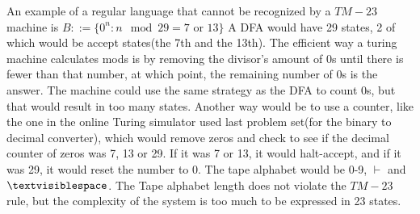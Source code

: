 \documentclass{article}
\begin{document}
\begin{center}
\end{center}

An example of a regular language that cannot be recognized by a $TM-23$ machine is $B ::= \{0^n:n \mod 29 = 7 \text{ or } 13\}$ A DFA would have 29 states, 2 of which would be accept states(the 7th and the 13th). The efficient way a turing machine calculates mods is by removing the divisor's amount of 0s until there is fewer than that number, at which point, the remaining number of 0s is the answer. The machine could use the same strategy as the DFA to count 0s, but that would result in too many states. Another way would be to use a counter, like the one in the online Turing simulator used last problem set(for the binary to decimal converter), which would remove zeros and check to see if the decimal counter of zeros was 7, 13 or 29. If it was 7 or 13, it would halt-accept, and if it was 29, it would reset the number to 0. The tape alphabet would be 0-9, $\vdash$ and $\textvisiblespace$. The Tape alphabet length does not violate the $TM-23$ rule, but the complexity of the system is too much to be expressed in 23 states.
\end{document}
